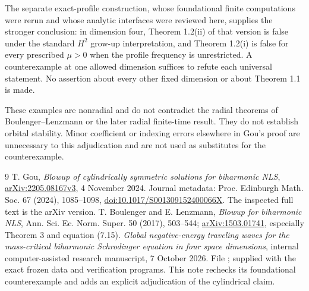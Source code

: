 \documentclass[11pt,a4paper]{article}
\begin{document}
The separate exact-profile construction, whose foundational finite computations were rerun and whose analytic interfaces were reviewed here, supplies the stronger conclusion: in dimension four, Theorem 1.2(ii) of that version is false under the standard $H^2$ grow-up interpretation, and Theorem 1.2(i) is false for every prescribed $\mu>0$ when the profile frequency is unrestricted. A counterexample at one allowed dimension suffices to refute each universal statement. No assertion about every other fixed dimension or about Theorem 1.1 is made.

These examples are nonradial and do not contradict the radial theorems of Boulenger--Lenzmann or the later radial finite-time result. They do not establish orbital stability. Minor coefficient or indexing errors elsewhere in Gou's proof are unnecessary to this adjudication and are not used as substitutes for the counterexample.

\begin{thebibliography}{9}
 T. Gou, \emph{Blowup of cylindrically symmetric solutions for biharmonic NLS}, \href{https://arxiv.org/html/2205.08167v3}{arXiv:2205.08167v3}, 4 November 2024. Journal metadata: Proc. Edinburgh Math. Soc. 67 (2024), 1085--1098, \href{https://doi.org/10.1017/S001309152400066X}{doi:10.1017/S001309152400066X}. The inspected full text is the arXiv version.
 T. Boulenger and E. Lenzmann, \emph{Blowup for biharmonic NLS}, Ann. Sci. Ec. Norm. Super. 50 (2017), 503--544; \href{https://arxiv.org/pdf/1503.01741}{arXiv:1503.01741}, especially Theorem 3 and equation (7.15).
 \emph{Global negative-energy traveling waves for the mass-critical biharmonic Schrodinger equation in four space dimensions}, internal computer-assisted research manuscript, 7 October 2026. File ; supplied with the exact frozen data and verification programs. This note rechecks its foundational counterexample and adds an explicit adjudication of the cylindrical claim.
\end{thebibliography}
\end{document}
